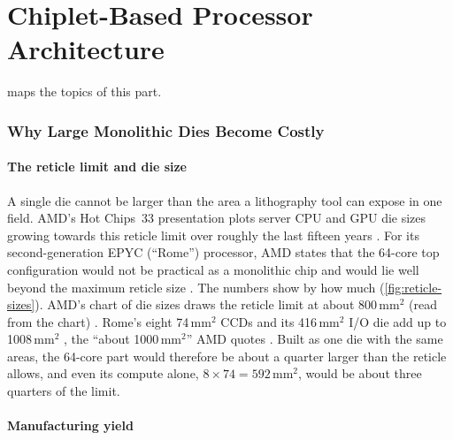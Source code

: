 \clearpage
\part{Chiplet-Based Processor Architecture}
\label{part:chiplets}
 maps the topics of this part.



\section{Why Large Monolithic Dies Become Costly}
\label{sec:monolithic-limits}

\subsection{The reticle limit and die size}
A single die cannot be larger than the area a lithography tool can expose in one field. AMD's Hot Chips~33 presentation plots server CPU and GPU die sizes growing towards this reticle limit over roughly the last fifteen years \cite{swaminathanAdvancedPackagingEnabling2021}. For its second-generation EPYC (``Rome'') processor, AMD states that the 64-core top configuration would not be practical as a monolithic chip and would lie well beyond the maximum reticle size \cite{naffziger2020chiplet}. The numbers show by how much (\cref{fig:reticle-sizes}). AMD's chart of die sizes draws the reticle limit at about 800\,mm$^2$ (read from the chart) \cite[slide~3]{swaminathanAdvancedPackagingEnabling2021}. Rome's eight 74\,mm$^2$ CCDs and its 416\,mm$^2$ I/O die add up to 1008\,mm$^2$ \cite{naffziger2020chiplet}, the ``about 1000\,mm$^2$'' AMD quotes \cite[slide~19]{suggs2019zen2}. Built as one die with the same areas, the 64-core part would therefore be about a quarter larger than the reticle allows, and even its compute alone, $8 \times 74 = 592$\,mm$^2$, would be about three quarters of the limit.



\subsection{Manufacturing yield}
\label{sec:yield-cost}

